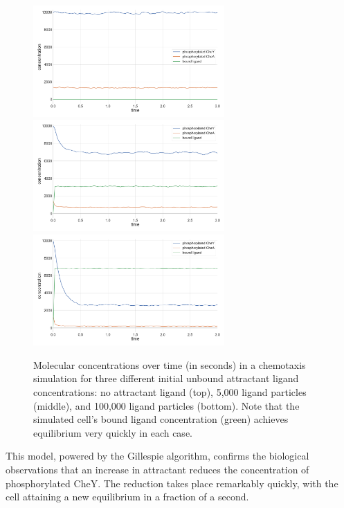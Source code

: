 \begin{figure}[hp]
\centering
\mySfFamily
\includegraphics[width = 0.65\textwidth]{../images/chemotaxis_tutorial5_vscode.png}\\[1ex]
\includegraphics[width = 0.65\textwidth]{../images/chemotaxis_tutorial6_vscode.png}\\[1ex]
\includegraphics[width = 0.65\textwidth]{../images/chemotaxis_tutorial7_vscode.png}
\caption{Molecular concentrations over time (in seconds) in a chemotaxis simulation for three different initial unbound attractant ligand concentrations: no attractant ligand (top), 5,000 ligand particles (middle), and 100,000 ligand particles (bottom). Note that the simulated cell's bound ligand concentration (green) achieves equilibrium very quickly in each case.}
\label{fig:chemotaxis_concentrations}
\end{figure}

This model, powered by the Gillespie algorithm, confirms the biological observations that an increase in attractant reduces the concentration of phosphorylated CheY. The reduction takes place remarkably quickly, with the cell attaining a new equilibrium in a fraction of a second.

